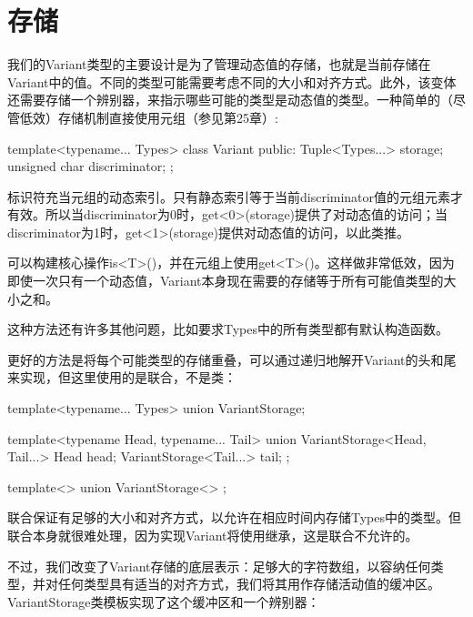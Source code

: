 \section{存储}
我们的Variant类型的主要设计是为了管理动态值的存储，也就是当前存储在Variant中的值。不同的类型可能需要考虑不同的大小和对齐方式。此外，该变体还需要存储一个辨别器，来指示哪些可能的类型是动态值的类型。一种简单的（尽管低效）存储机制直接使用元组（参见第25章）:

\begin{cpp}
template<typename... Types>
class Variant {
	public:
	Tuple<Types...> storage;
	unsigned char discriminator;
};
\end{cpp}

标识符充当元组的动态索引。只有静态索引等于当前discriminator值的元组元素才有效。所以当discriminator为0时，get<0>(storage)提供了对动态值的访问；当discriminator为1时，get<1>(storage)提供对动态值的访问，以此类推。

可以构建核心操作is<T>()，并在元组上使用get<T>()。这样做非常低效，因为即使一次只有一个动态值，Variant本身现在需要的存储等于所有可能值类型的大小之和。

\begin{notice}
这种方法还有许多其他问题，比如要求Types中的所有类型都有默认构造函数。
\end{notice}

更好的方法是将每个可能类型的存储重叠，可以通过递归地解开Variant的头和尾来实现，但这里使用的是联合，不是类：

\begin{cpp}
template<typename... Types>
union VariantStorage;

template<typename Head, typename... Tail>
union VariantStorage<Head, Tail...> {
	Head head;
	VariantStorage<Tail...> tail;
};

template<>
union VariantStorage<> {};
\end{cpp}

联合保证有足够的大小和对齐方式，以允许在相应时间内存储Types中的类型。但联合本身就很难处理，因为实现Variant将使用继承，这是联合不允许的。

不过，我们改变了Variant存储的底层表示：足够大的字符数组，以容纳任何类型，并对任何类型具有适当的对齐方式，我们将其用作存储活动值的缓冲区。VariantStorage类模板实现了这个缓冲区和一个辨别器：

